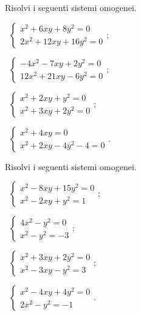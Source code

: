 \begin{esercizio}[\Ast]
\label{ese:6.50}
Risolvi i seguenti sistemi omogenei.
\begin{multicols}{2}
 \begin{enumeratea}
 \item~$\left\{\begin{array}{l}x^2+6xy+8y^2=0\\2x^2+12xy+16y^2=0\end{array}\right.$;
 \item~$\left\{\begin{array}{l}-4x^2-7{xy}+2y^2=0 \\12x^2+21{xy}-6y^2=0 \end{array}\right.$;
 \item~$\left\{\begin{array}{l}x^2+2xy+y^2=0\\x^2+3xy+2y^2=0\end{array}\right.$;
 \item~$\left\{\begin{array}{l}x^2+4xy=0\\x^2+2xy-4y^2-4=0\end{array}\right.$.
 \end{enumeratea}
\end{multicols}
\end{esercizio}

\begin{esercizio}[\Ast]
\label{ese:6.51}
Risolvi i seguenti sistemi omogenei.
\begin{multicols}{2}
 \begin{enumeratea}
 \item~$\left\{\begin{array}{l}x^2-8xy+15y^2=0\\x^2-2xy+y^2=1\end{array}\right.$;
 \item~$\left\{\begin{array}{l}4x^2-y^2=0\\x^2-y^2=-3\end{array}\right.$;
 \item~$\left\{\begin{array}{l}x^2+3xy+2y^2=0\\x^2-3xy-y^2=3\end{array}\right.$;
 \item~$\left\{\begin{array}{l}x^2-4xy+4y^2=0\\2x^2-y^2=-1\end{array}\right.$.
 \end{enumeratea}
\end{multicols}
\end{esercizio}

